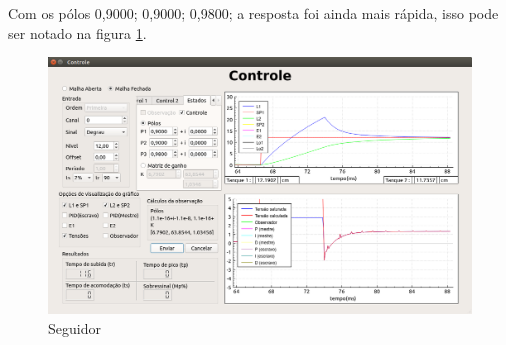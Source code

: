 \documentclass[a4paper,12pt]{article}
\begin{document}
\hspace{4ex}Com os pólos 0,9000; 0,9000; 0,9800; a resposta foi ainda mais rápida, isso pode ser notado na figura \ref{img4}.
\begin{figure}[!h]
\centering
\includegraphics[width=13cm]{FotosSeguidor/MuitoBom}
\caption{Seguidor}
\label{img4}
\end{figure}
\end{document}
